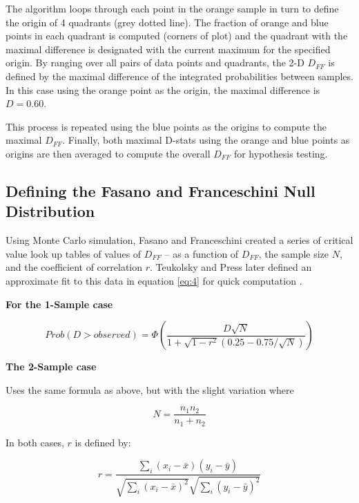 \documentclass[codesnippet]{jss}
\begin{document}
The algorithm loops through each point in the orange sample in turn to define the origin of 4 quadrants (grey dotted line). The fraction of orange and blue points in each quadrant is computed (corners of plot) and the quadrant with the maximal difference is designated with the current maximum for the specified origin. By ranging over all pairs of data points and quadrants, the 2-D $D_{FF}$ is defined by the maximal difference of the integrated probabilities between samples. In this case using the orange point as the origin, the maximal difference is $D = 0.60$.

This process is repeated using the blue points as the origins to compute the maximal $D_{FF}$. Finally, both maximal D-stats using the orange and blue points as origins are then averaged to compute the overall $D_{FF}$ for hypothesis testing.

\subsection{Defining the Fasano and Franceschini Null Distribution}

Using Monte Carlo simulation, Fasano and Franceschini created a series of critical value look up tables of values of $D_{FF}$ -- as a function of $D_{FF}$, the sample size $N$, and the coefficient of correlation $r$. Teukolsky and Press later defined an approximate fit to this data in equation \ref{eq:4} for quick computation \cite{numericalRecipes}.

\textbf{For the 1-Sample case}

\begin{equation} \label{eq:4}
Prob(D > observed) = \Phi ( \frac{D\sqrt{N}}{1+\sqrt{1-r^2}(0.25-0.75/\sqrt{N})})
\end{equation}

\textbf{The 2-Sample case}

Uses the same formula as above, but with the slight variation where

\begin{equation} \label{eq:5}
N = \frac{n_1n_2}{n_1+n_2}
\end{equation}

In both cases, $r$ is defined by:

\begin{equation} \label{eq:6}
r = \frac{\sum_{i}^{}(x_i-\bar{x})(y_i-\bar{y})}{\sqrt{\sum_{i}^{}(x_i-\bar{x})^2}\sqrt{\sum_{i}^{}(y_i-\bar{y})^2}}
\end{equation}
\end{document}
